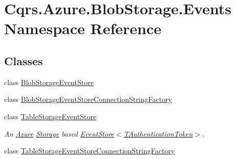 \hypertarget{namespaceCqrs_1_1Azure_1_1BlobStorage_1_1Events}{}\section{Cqrs.\+Azure.\+Blob\+Storage.\+Events Namespace Reference}
\label{namespaceCqrs_1_1Azure_1_1BlobStorage_1_1Events}
\subsection*{Classes}
\begin{DoxyCompactItemize}
\item 
class \hyperlink{classCqrs_1_1Azure_1_1BlobStorage_1_1Events_1_1BlobStorageEventStore}{Blob\+Storage\+Event\+Store}
\item 
class \hyperlink{classCqrs_1_1Azure_1_1BlobStorage_1_1Events_1_1BlobStorageEventStoreConnectionStringFactory}{Blob\+Storage\+Event\+Store\+Connection\+String\+Factory}
\item 
class \hyperlink{classCqrs_1_1Azure_1_1BlobStorage_1_1Events_1_1TableStorageEventStore}{Table\+Storage\+Event\+Store}
\begin{DoxyCompactList}\small\item\em An \hyperlink{namespaceCqrs_1_1Azure}{Azure} \hyperlink{namespaceCqrs_1_1Azure_1_1Storage}{Storage} based \hyperlink{classCqrs_1_1Events_1_1EventStore_a6346cb2aea4c5b4e740dc6cfb15abab8_a6346cb2aea4c5b4e740dc6cfb15abab8}{Event\+Store$<$\+T\+Authentication\+Token$>$}. \end{DoxyCompactList}\item 
class \hyperlink{classCqrs_1_1Azure_1_1BlobStorage_1_1Events_1_1TableStorageEventStoreConnectionStringFactory}{Table\+Storage\+Event\+Store\+Connection\+String\+Factory}
\end{DoxyCompactItemize}
